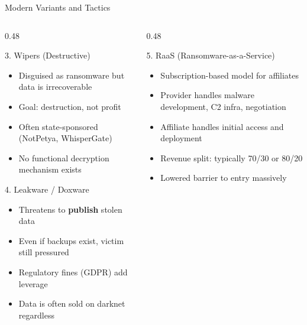 \documentclass[aspectratio=169]{beamer}
\begin{document}
\begin{frame}{Modern Variants and Tactics}
  \begin{columns}[T]
    \begin{column}{0.48\textwidth}
      \begin{block}{3. Wipers (Destructive)}
        \footnotesize
        \begin{itemize}
          \item Disguised as ransomware but data is irrecoverable
          \item Goal: destruction, not profit
          \item Often state-sponsored (NotPetya, WhisperGate)
          \item No functional decryption mechanism exists
        \end{itemize}
      \end{block}
      \vspace{0.3em}
      \begin{block}{4. Leakware / Doxware}
        \footnotesize
        \begin{itemize}
          \item Threatens to \textbf{publish} stolen data
          \item Even if backups exist, victim still pressured
          \item Regulatory fines (GDPR) add leverage
          \item Data is often sold on darknet regardless
        \end{itemize}
      \end{block}
    \end{column}
    \begin{column}{0.48\textwidth}
      \begin{block}{5. RaaS (Ransomware-as-a-Service)}
        \footnotesize
        \begin{itemize}
          \item Subscription-based model for affiliates
          \item Provider handles malware development, C2 infra, negotiation
          \item Affiliate handles initial access and deployment
          \item Revenue split: typically 70/30 or 80/20
          \item Lowered barrier to entry massively
        \end{itemize}
      \end{block}
      \vspace{0.3em}

\end{column}
\end{columns}
\end{frame}
\end{document}
